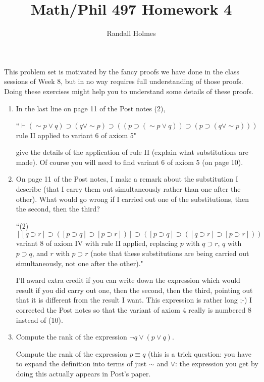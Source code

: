 \documentclass[12pt]{article}
\title{Math/Phil 497 Homework 4}
\author{Randall Holmes}
\begin{document}
\maketitle

This problem set is motivated by the fancy proofs we have done in the class sessions of Week 8, but in no way requires full understanding of those proofs.  Doing these
exercises might help you to understand some details of these proofs.

\begin{enumerate}

\item  In the last line on page 11 of the Post notes (2),

``$\vdash (\sim p \vee q) \supset (q \vee \sim p) \supset ((p \supset (\sim p \vee q)) \supset (p \supset (q \vee \sim p)))$  rule II applied to variant 6 of axiom 5"

give the details of the application of rule II (explain what substitutions are made).  Of course you will need to find variant 6 of axiom 5 (on page 10).

\item  On page 11 of the Post notes, I make a remark about the substitution I describe (that I carry them out simultaneously rather than one after the other).  What would  go wrong if I carried out one of the substitutions, then the second, then the third?

``(2)  $[[q \supset r] \supset ([p \supset q] \supset  [p \supset r])] \supset ([p \supset q] \supset  ([q \supset r] \supset [p \supset r]))$  variant 8 of axiom IV with rule II
applied, replacing $p$ with $q \supset r$, $q$ with $p \supset q$, and $r$ with $p \supset r$ (note that these substitutions are being carried out simultaneously, not one after the other)."

I'll award extra credit if you can write down the expression which would result if you did carry out one, then the second, then the third, pointing out that it is different from the result I want.  This expression is rather long ;-)  I corrected the Post notes so that the variant of axiom 4 really is numbered {8} instead of (10).

\item Compute the rank of the expression $\neg q \vee (p \vee q)$.

Compute the rank of the expression $p \equiv q$ (this is a trick question:  you have to expand the definition into terms of just $\sim$ and $\vee$:  the expression you get by doing this actually appears in Post's paper.


\end{enumerate}
\end{document}
